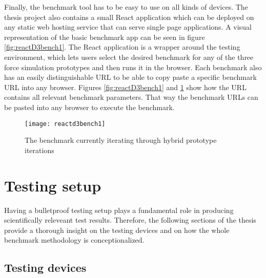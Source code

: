 Finally, the benchmark tool has to be easy to use on all kinds of devices. The thesis project also contains a small React application which can be deployed on any static web hosting service that can serve single page applications. A visual representation of the basic benchmark app can be seen in figure \ref{fig:reactD3bench1}. The React application is a wrapper around the testing environment, which lets users select the desired benchmark for any of the three force simulation prototypes and then runs it in the browser. Each benchmark also has an easily distinguishable URL to be able to copy paste a specific benchmark URL into any browser. Figures \ref{fig:reactD3bench1} and \ref{fig:reactD3bench2} show how the URL contains all relevant benchmark parameters. That way the benchmark URLs can be pasted into any browser to execute the benchmark. 

\begin{figure}
  \centering
  \texttt{[image: reactd3bench1]}
  \caption{The benchmark currently iterating through hybrid prototype iterations}
  \label{fig:reactD3bench2}
\end{figure}

\section{Testing setup}

Having a bulletproof testing setup plays a fundamental role in producing scientifically releveant test results. Therefore, the following sections of the thesis provide a thorough insight on the testing devices and on how the whole benchmark methodology is conceptionalized. 

\subsection{Testing devices}

